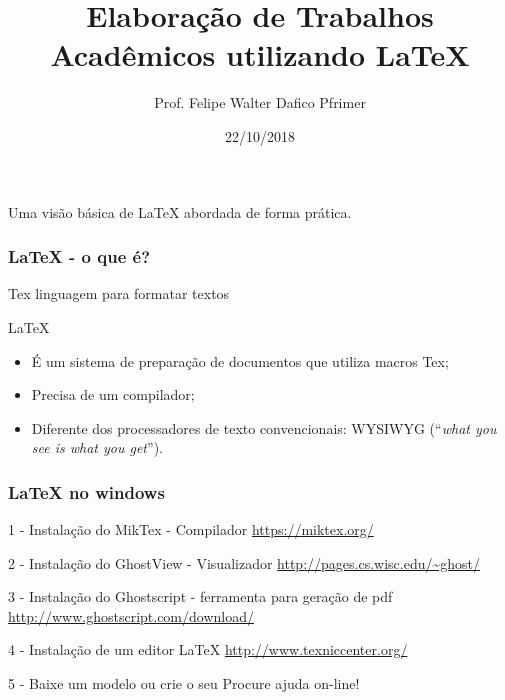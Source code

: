\documentclass{beamer}
\title[Curso de \LaTeX]{Elaboração de Trabalhos Acadêmicos utilizando LaTeX}
\author[F. Pfrimer]{Prof. Felipe Walter Dafico Pfrimer}
\institute[UTFPR]{Universidade Tecnológica Federal do Paraná}
\date{22/10/2018}
\begin{document}
\begin{frame}
  \titlepage

  \begin{center}
    Uma visão básica de \LaTeX{} abordada de forma prática.
  \end{center}
\end{frame}

\begin{frame}
  \frametitle{\LaTeX{} - o que é?}
  \pause
  \begin{block}{Tex}
    linguagem para formatar textos
  \end{block}
  \pause
  \begin{block}{\LaTeX}
    \begin{itemize}
        \pause
        \item  É um sistema de preparação de documentos que utiliza macros Tex;
        \pause
        \item  Precisa de um compilador;
        \pause
        \item  Diferente dos processadores de texto convencionais: WYSIWYG (``\textit{what you see is what you get}'').
    \end{itemize}
  \end{block}
\end{frame}

\begin{frame}
    \frametitle{\LaTeX{} no windows}
    \pause
    \begin{block}{1 - Instalação do MikTex - Compilador}
        \url{https://miktex.org/}
    \end{block}
    \pause
    \begin{block}{2 - Instalação do GhostView - Visualizador}
        \url{http://pages.cs.wisc.edu/~ghost/}
    \end{block}
    \pause    
    \begin{block}{3 - Instalação do Ghostscript - ferramenta para geração de pdf}
        \url{http://www.ghostscript.com/download/}
    \end{block}
    \pause    
    \begin{block}{4 - Instalação de um editor \LaTeX{}}
        \url{http://www.texniccenter.org/}
    \end{block}
    \pause    
    \begin{block}{5 - Baixe um modelo ou crie o seu}
        Procure ajuda on-line!
    \end{block}
\end{frame}
\end{document}
